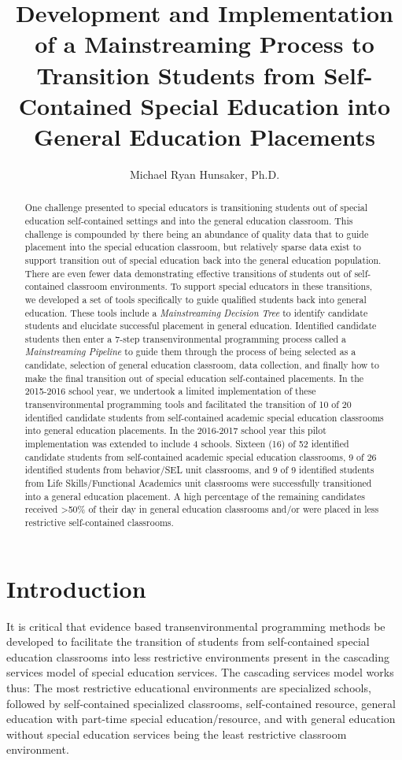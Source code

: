 \documentclass[twoside]{article}
\title{Development and Implementation of a Mainstreaming Process to Transition Students from Self-Contained Special Education into General Education Placements}
\author[1]{Michael Ryan Hunsaker, Ph.D.}
\affil[1]{Granite School District, Salt Lake City, UT}
\begin{document}
\maketitle
\begin{abstract}One challenge presented to special educators is transitioning students out of special education self-contained settings and into the general education classroom. This challenge is compounded by there being an abundance of quality data that to guide placement into the special education classroom, but relatively sparse data exist to support transition out of special education back into the general education population. There are even fewer data demonstrating effective transitions of students out of self-contained classroom environments. To support special educators in these transitions, we developed a set of tools specifically to guide qualified students back into general education. These tools include a \textit{Mainstreaming Decision Tree} to identify candidate students and elucidate successful placement in general education. Identified candidate students then enter a 7-step transenvironmental programming process called a \textit{Mainstreaming Pipeline} to guide them through the process of being selected as a candidate, selection of general education classroom, data collection, and finally how to make the final transition out of special education self-contained placements. In the 2015-2016 school year, we undertook a limited implementation of these transenvironmental programming tools and facilitated the transition of 10 of 20 identified candidate students from self-contained academic special education classrooms into general education placements. In the 2016-2017 school year this pilot implementation was extended to include 4 schools. Sixteen (16) of 52 identified candidate students from self-contained academic special education classrooms, 9 of 26 identified students from behavior/SEL unit classrooms, and 9 of 9 identified students from Life Skills/Functional Academics unit classrooms were successfully transitioned into a general education placement. A high percentage of the remaining candidates received \textgreater 50\% of their day in general education classrooms and/or were placed in less restrictive self-contained classrooms.
\end{abstract}
\section{Introduction}
It is critical that evidence based transenvironmental programming methods be developed to facilitate the transition of students from self-contained special education classrooms into less restrictive environments present in the cascading services model of special education services. The cascading services model works thus: The most restrictive educational environments are specialized schools, followed by self-contained specialized classrooms, self-contained resource, general education with part-time special education/resource, and with general education without special education services being the least restrictive classroom environment. 
\end{document}
